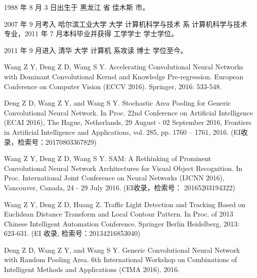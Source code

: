 \begin{resume}


  1988 年 8 月 3 日出生于 黑龙江 省  佳木斯 市。

  2007 年 9 月考入 哈尔滨工业大学 大学 计算机科学与技术 系 计算机科学与技术 专业，2011 年 7 月本科毕业并获得 工学学士 学士学位。

  2011 年 9 月进入 清华 大学 计算机 系攻读 博士 学位至今。


  \begin{publications}
    \item  Wang Z Y, Deng Z D, Wang S Y. Accelerating Convolutional Neural Networks with Dominant Convolutional Kernel and Knowledge Pre-regression. European Conference on Computer Vision (ECCV 2016). Springer, 2016: 533-548.
    \item Deng Z D, Wang Z Y, and Wang S Y. Stochastic Area Pooling for Generic Convolutional Neural Network. In Proc. 22nd Conference on Artificial Intelligence (ECAI 2016),  The Hague, Netherlands, 29 August - 02 September 2016, Frontiers in Artificial Intelligence and Applications, vol. 285, pp. 1760 – 1761, 2016. (EI收录，检索号：20170803367829)
     \item Wang Z Y, Deng Z D, Wang S Y. SAM: A Rethinking of Prominent Convolutional Neural Network Architectures for Visual Object Recognition. In Proc. International Joint Conference on Neural Networks (IJCNN 2016), Vancouver, Canada, 24 - 29 July 2016. (EI收录，检索号：	20165203194322)
     \item Wang Z Y, Deng Z D, Huang Z. Traffic Light Detection and Tracking Based on Euclidean Distance Transform and Local Contour Pattern. In Proc. of 2013 Chinese Intelligent Automation Conference. Springer Berlin Heidelberg, 2013: 623-631. (EI 收录,  检索号：20134216853040)
      \item Deng Z D, Wang Z Y, and Wang S Y. Generic Convolutional Neural Network with Random Pooling Area. 6th International Workshop on Combinations of Intelligent Methods and Applications (CIMA 2016). 2016.
  \end{publications}



\end{resume}
